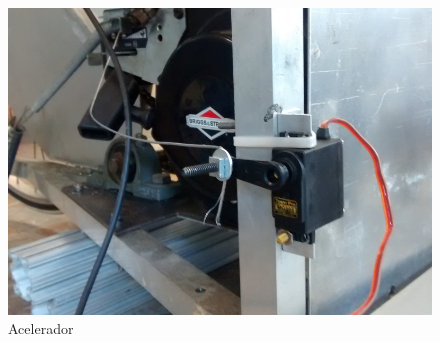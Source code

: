 \begin{figure}
\centering
\includegraphics[width=4.5in]{fotos/acelerador}
\caption{Acelerador}
\label{fig:fotos:acelerador}
\end{figure}
